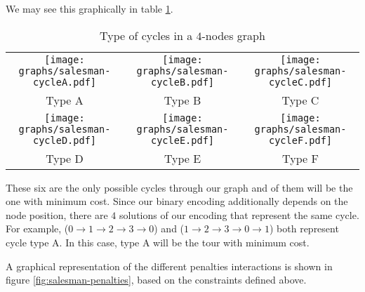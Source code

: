 We may see this graphically in table \ref{tbl:salesman-cycles}.

\begin{table}[H]
	\centering
	\begin{tabular}{ccc}		
		\texttt{[image: graphs/salesman-cycleA.pdf]} &
		\texttt{[image: graphs/salesman-cycleB.pdf]} &
		\texttt{[image: graphs/salesman-cycleC.pdf]} \\
		
		Type A & Type B & Type C \\
		
		\texttt{[image: graphs/salesman-cycleD.pdf]} &
		\texttt{[image: graphs/salesman-cycleE.pdf]} &
		\texttt{[image: graphs/salesman-cycleF.pdf]} \\
		
		Type D & Type E & Type F \\
	\end{tabular}
	\caption{Type of cycles in a $4$-nodes graph}
	\label{tbl:salesman-cycles}
\end{table}

These six are the only possible cycles through our graph and of them will be the one with minimum cost. Since our binary encoding additionally depends on the node position, there are $4$ solutions of our encoding that represent the same cycle. For example, ($0 \rightarrow 1 \rightarrow 2 \rightarrow 3 \rightarrow 0$) and ($1 \rightarrow 2 \rightarrow 3 \rightarrow 0 \rightarrow 1$) both represent cycle type A. In this case, type A will be the tour with minimum cost.

A graphical representation of the different penalties interactions is shown in figure \ref{fig:salesman-penalties}, based on the constraints defined above.

